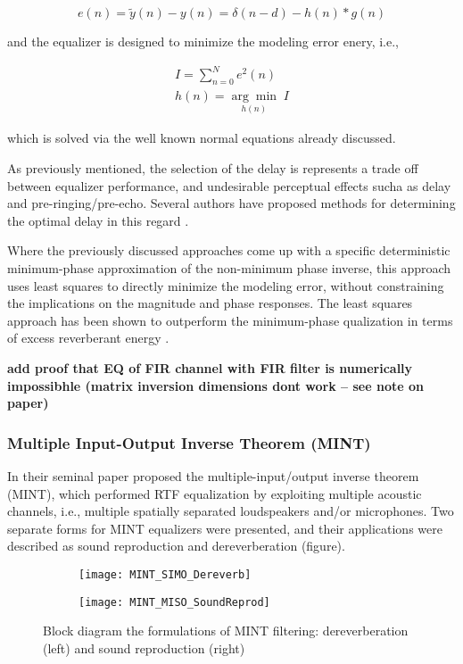 \begin{equation}
	e(n) = \tilde{y}(n)  - y(n) = \delta(n-d) - h(n)*g(n)
\end{equation}

\noindent
and the equalizer is designed to minimize the modeling error enery, i.e.,

\begin{eqnarray}
I = \sum_{n=0}^{N}e^2(n) \\
h(n) = \underset{h(n)}{\arg\min}\;I
\end{eqnarray}

\noindent
which is solved via the well known normal equations already discussed.

As previously mentioned, the selection of the delay is represents a trade off between equalizer performance, and undesirable perceptual effects sucha as delay and pre-ringing/pre-echo. Several authors have proposed methods for determining the optimal delay in this regard \citep{clarkson1985spectral, ford1978optimum}.

Where the previously discussed approaches come up with a specific deterministic minimum-phase approximation of the non-minimum phase inverse, this approach uses least squares to directly minimize the modeling error, without constraining the implications on the magnitude and phase responses. The least squares approach has been shown to outperform the minimum-phase qualization in terms of excess reverberant energy \citep{mourjopoulos1982comparative}.

\textbf{add proof that EQ of FIR channel with FIR filter is numerically impossibhle (matrix inversion dimensions dont work -- see note on paper)}

\subsubsection{Multiple Input-Output Inverse Theorem (MINT)} \label{MINT}

In their seminal paper \cite{miyoshi1986inverse} proposed the multiple-input/output inverse theorem (MINT), which performed RTF equalization by exploiting multiple acoustic channels, i.e., multiple spatially separated loudspeakers and/or microphones. Two separate forms for MINT equalizers were presented, and their applications were described as sound reproduction and dereverberation (figure).

\begin{figure}[H]
	\centering
	\begin{subfigure}[b]{0.49\textwidth}
		\centering
		\texttt{[image: MINT\_SIMO\_Dereverb]}
	\end{subfigure}
	\hfill
	\begin{subfigure}[b]{0.49\textwidth}
		\centering
		\texttt{[image: MINT\_MISO\_SoundReprod]}
	\end{subfigure}
	\caption{Block diagram the formulations of MINT filtering: dereverberation (left) and sound reproduction (right)}
	\label{fig:MINT_Structures}
\end{figure}

